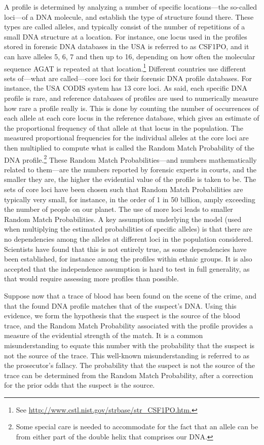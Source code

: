 \documentclass[10pt]{article}
\begin{document}
A profile is determined by analyzing a number of specific locations---the so-called loci---of a DNA molecule, and establish the type of structure found there. These types are called alleles, and typically consist of the number of repetitions of a small DNA structure at a location. For instance, one locus used in the profiles stored in forensic DNA databases in the USA is referred to as CSF1PO, and it can have alleles 5, 6, 7 and then up to 16, depending on how often the molecular sequence AGAT is repeated at that location.\footnote{See \url{http://www.cstl.nist.gov/strbase/str\_CSF1PO.htm.}} Different countries use different sets of---what are called---core loci for their forensic DNA profile databases. For instance, the USA CODIS system has 13 core loci. As said, each specific DNA profile is rare, and reference databases of profiles are used to numerically measure how rare a profile really is. This is done by counting the number of occurrences of each allele at each core locus in the reference database, which gives an estimate of the proportional frequency of that allele at that locus in the population. The measured proportional frequencies for the individual alleles at the core loci are then multiplied to compute what is called the Random Match Probability of the DNA profile.\footnote{Some special care is needed to accommodate for the fact that an allele can be from either part of the double helix that comprises our DNA.} These Random Match Probabilities---and numbers mathematically related to them---are the numbers reported by forensic experts in courts, and the smaller they are, the higher the evidential value of the profile is taken to be. The sets of core loci have been chosen such that Random Match Probabilities are typically very small, for instance, in the order of 1 in 50 billion, amply exceeding the number of people on our planet. The use of more loci leads to smaller Random Match Probabilities. A key assumption underlying the model (used when multiplying the estimated probabilities of specific alleles) is that there are no dependencies among the alleles at different loci in the population considered. Scientists have found that this is not entirely true, as some dependencies have been established, for instance among the profiles within ethnic groups. It is also accepted that the independence assumption is hard to test in full generality, as that would require assessing more profiles than possible.

Suppose now that a trace of blood has been found on the scene of the crime, and that the found DNA profile matches that of the suspect's DNA. Using this evidence, we form the hypothesis that the suspect is the source of the blood trace, and the Random Match Probability associated with the profile provides a measure of the evidential strength of the match. It is a common misunderstanding to equate this number with the probability that the suspect is not the source of the trace. This well-known misunderstanding is referred to as the prosecutor's fallacy. The probability that the suspect is not the source of the trace can be determined from the Random Match Probability, after a correction for the prior odds that the suspect is the source.
\end{document}
